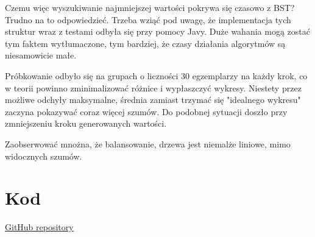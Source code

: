 \documentclass[11pt,a4paper]{article}
\begin{document}
Czemu więc wyszukiwanie najmniejszej wartości pokrywa się czasowo z BST? Trudno na to odpowiedzieć. Trzeba wziąć pod uwagę, że implementacja tych struktur wraz z testami odbyła się przy pomocy Javy. Duże wahania mogą zostać tym faktem wytłumaczone, tym bardziej, że czasy działania algorytmów są niesamowicie małe.

Próbkowanie odbyło się na grupach o liczności 30 egzemplarzy na każdy krok, co w teorii powinno zminimalizować różnice i wypłaszczyć wykresy. Niestety przez możliwe odchyły maksymalne, średnia zamiast trzymać się "idealnego wykresu" zaczyna pokazywać coraz więcej szumów. Do podobnej sytuacji doszło przy zmniejszeniu kroku generowanych wartości.

Zaobserwować mnożna, że balansowanie, drzewa jest niemalże liniowe, mimo widocznych szumów.

\section{Kod}

\href{https://github.com/McSymilian/AISD_PUT_Testing_Support/tree/master/src/main/java/org/data_structures/tree}{GitHub repository}
\end{document}

